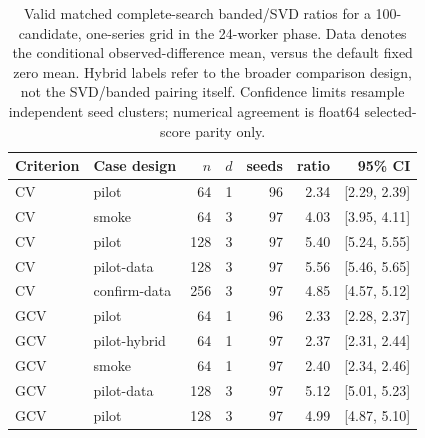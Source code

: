 \newcommand{\EmpiricalJobs}{2813}
\newcommand{\EmpiricalRows}{92679}
\newcommand{\EmpiricalValidRows}{76220}
\newcommand{\EmpiricalFailedJobs}{57}
\begin{table}[t]
\caption{Valid matched complete-search banded/SVD ratios for a 100-candidate, one-series grid in the 24-worker phase. Data denotes the conditional observed-difference mean, versus the default fixed zero mean. Hybrid labels refer to the broader comparison design, not the SVD/banded pairing itself. Confidence limits resample independent seed clusters; numerical agreement is float64 selected-score parity only.}
\label{tab:empirical-paired}
\centering\small
\begin{tabular}{llrrrrr}
\toprule
Criterion & Case design & $n$ & $d$ & seeds & ratio & 95\% CI\\
\midrule
CV & pilot & 64 & 1 & 96 & 2.34 & [2.29, 2.39]\\
CV & smoke & 64 & 3 & 97 & 4.03 & [3.95, 4.11]\\
CV & pilot & 128 & 3 & 97 & 5.40 & [5.24, 5.55]\\
CV & pilot-data & 128 & 3 & 97 & 5.56 & [5.46, 5.65]\\
CV & confirm-data & 256 & 3 & 97 & 4.85 & [4.57, 5.12]\\
GCV & pilot & 64 & 1 & 96 & 2.33 & [2.28, 2.37]\\
GCV & pilot-hybrid & 64 & 1 & 97 & 2.37 & [2.31, 2.44]\\
GCV & smoke & 64 & 1 & 97 & 2.40 & [2.34, 2.46]\\
GCV & pilot-data & 128 & 3 & 97 & 5.12 & [5.01, 5.23]\\
GCV & pilot & 128 & 3 & 97 & 4.99 & [4.87, 5.10]\\
\bottomrule
\end{tabular}
\end{table}
